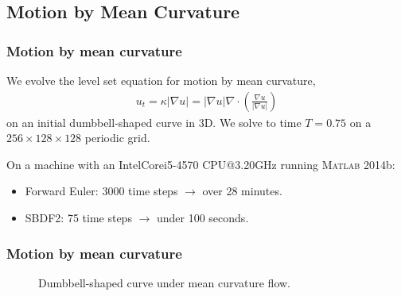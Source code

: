 \documentclass[hyperref={pdfpagelabels=false}]{beamer}
\begin{document}
\subsection{Motion by Mean Curvature}
\begin{frame}
	\frametitle{Motion by mean curvature}
We evolve the level set equation for motion by mean curvature, 
\begin{align*}
u_t 
= \kappa \left\vert \nabla u \right\vert 
= \left\vert \nabla u \right\vert \nabla \cdot \left(\frac{\nabla u}{\left\vert \nabla u \right\vert} 
\right)
\end{align*}
on an initial dumbbell-shaped curve in 3D. We solve to time $T=0.75$ on a $256\times 128\times 128$ periodic grid.

On a machine with an Intel\textsuperscript{\textregistered}Core\textsuperscript{\texttrademark}i5-4570 CPU@3.20GHz running \textsc{Matlab} 2014b: 
\begin{itemize}
	\item Forward Euler: 3000 time steps $\to$ over 28 minutes.
	
	\item SBDF2: 75 time steps $\to$ under 100 seconds.
\end{itemize}
\end{frame}
\begin{frame}
	\frametitle{Motion by mean curvature} 
	\begin{figure}
		\centering
\caption{Dumbbell-shaped curve under mean curvature flow.}
	\end{figure}
\end{frame}
\end{document}
